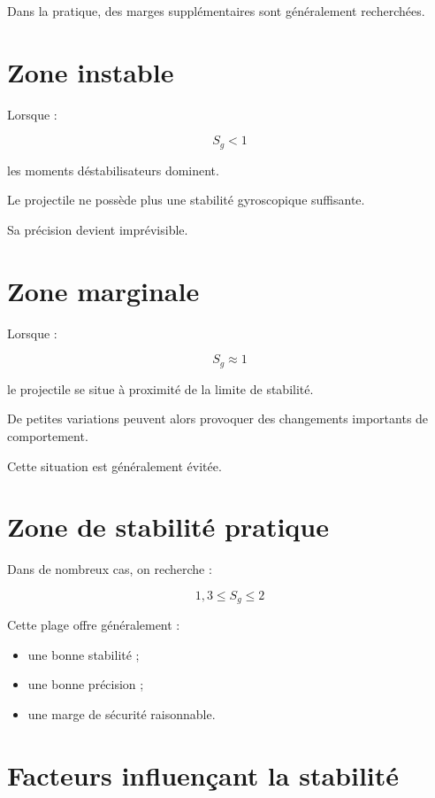 Dans la pratique, des marges supplémentaires sont généralement recherchées.

\section{Zone instable}

Lorsque :

\begin{equation}
S_g < 1
\end{equation}

les moments déstabilisateurs dominent.

Le projectile ne possède plus une stabilité gyroscopique suffisante.

Sa précision devient imprévisible.

\section{Zone marginale}

Lorsque :

\begin{equation}
S_g \approx 1
\end{equation}

le projectile se situe à proximité de la limite de stabilité.

De petites variations peuvent alors provoquer des changements importants de
comportement.

Cette situation est généralement évitée.

\section{Zone de stabilité pratique}

Dans de nombreux cas, on recherche :

\begin{equation}
1,3 \leq S_g \leq 2
\end{equation}

Cette plage offre généralement :

\begin{itemize}
    \item une bonne stabilité ;
    \item une bonne précision ;
    \item une marge de sécurité raisonnable.
\end{itemize}

\section{Facteurs influençant la stabilité}

